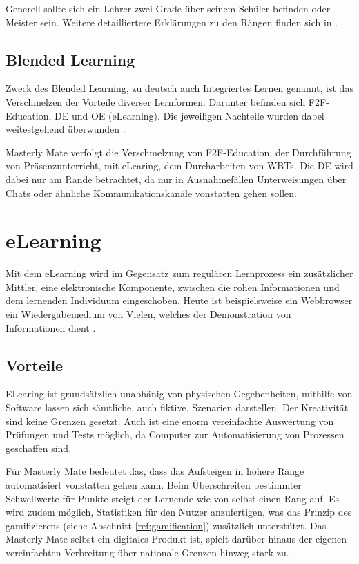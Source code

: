 Generell sollte sich ein Lehrer zwei Grade über seinem Schüler befinden oder
Meister sein. Weitere detailliertere Erklärungen zu den Rängen finden sich in
\cite{gruben:2012}.

\subsection{Blended Learning}\label{ref:blendedLearning}
Zweck des Blended Learning, zu deutsch auch Integriertes Lernen genannt, ist das
Verschmelzen der Vorteile diverser Lernformen. Darunter befinden sich
\ac{F2F}-Education, \ac{DE} und \ac{OE} (eLearning). Die jeweiligen Nachteile
wurden dabei weitestgehend überwunden \cite{kroeger:2004}.

Masterly Mate verfolgt die Verschmelzung von F2F-Education, der Durchführung von
Präsenzunterricht, mit eLearing, dem Durcharbeiten von WBTs. Die DE wird dabei
nur am Rande betrachtet, da nur in Ausnahmefällen Unterweisungen über Chats oder
ähnliche Kommunikationskanäle vonstatten gehen sollen.

\section{eLearning}
Mit dem eLearning wird im Gegensatz zum regulären Lernprozess ein zusätzlicher
Mittler, eine elektronische Komponente, zwischen die rohen Informationen und dem
lernenden Individuum eingeschoben. Heute ist beispielsweise ein Webbrowser ein
Wiedergabemedium von Vielen, welches der Demonstration von Informationen dient
\cite{baumgartner:2002}.

\subsection{Vorteile}
ELearing ist grundsätzlich unabhänig von physischen Gegebenheiten, mithilfe von
Software lassen sich sämtliche, auch fiktive, Szenarien darstellen. Der
Kreativität sind keine Grenzen gesetzt. Auch ist eine enorm vereinfachte
Auswertung von Prüfungen und Tests möglich, da Computer zur Automatisierung von
Prozessen geschaffen sind. 

Für Masterly Mate bedeutet das, dass das Aufsteigen in höhere Ränge
automatisiert vonstatten gehen kann. Beim Überschreiten bestimmter Schwellwerte für Punkte
steigt der Lernende wie von selbst einen Rang auf. Es wird zudem möglich,
Statistiken für den Nutzer anzufertigen, was das Prinzip des gamifizierens
(siehe Abschnitt \ref{ref:gamification}) zusätzlich unterstützt. Das
Masterly Mate selbst ein digitales Produkt ist, spielt darüber hinaus der
eigenen vereinfachten Verbreitung über nationale Grenzen hinweg stark zu.

